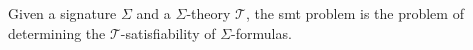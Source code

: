 

\begin{definition}
  Given a signature $\Sigma{}$ and a $\Sigma{}$-theory $\mathcal{T}$, the
  \gls{smt} problem is the problem of determining the
  $\mathcal{T}$-satisfiability of $\Sigma{}$-formulas.
\end{definition}
